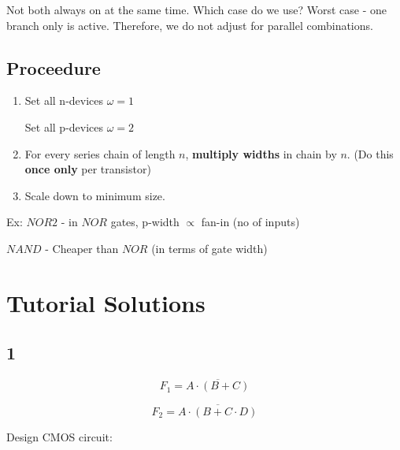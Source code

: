 \documentclass[a4paper,12pt]{article}
\begin{document}
Not both always on at the same time. Which case do we use? Worst case -
one branch only is active. Therefore, we do not adjust for parallel
combinations.


\subsection*{Proceedure}

\begin{enumerate}

\item \subitem Set all n-devices $\omega = 1$
		
		\subitem Set all p-devices $\omega = 2$

\item For every series chain of length $n$, \textbf{multiply widths} in
chain by $n$. (Do this \textbf{once only} per transistor)

\item Scale down to minimum size.

\end{enumerate}


\begin{table}[hbtp]


\caption{Ex: $NOR 2$ - in $NOR$ gates, p-width $\propto$ fan-in (no of
inputs)}

\end{table}


\begin{table}[hbtp]


\caption{$NAND$ - Cheaper than $NOR$ (in terms of gate width)}

\end{table}


\section*{Tutorial Solutions}

\subsection*{1}

\[ F_{1} = \overline{A \cdot \left( B + C \right) } \]

\[ F_{2} = \overline{A \cdot \left( B + C \cdot D \right) } \]

Design CMOS circuit:
\end{document}
